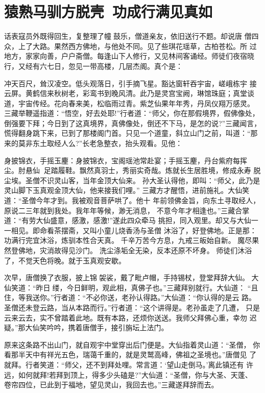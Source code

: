 \chapter{猿熟马驯方脱壳~功成行满见真如}

话表寇员外既得回生，复整理了幢鼓乐，僧道亲友，依旧送行不题。却说唐
僧四众，上了大路。果然西方佛地，与他处不同。见了些琪花瑶草，古柏苍松。所
过地方，家家向善，户户斋僧。每逢山下人修行，又见林间客诵经。师徒们夜宿晓
行，又经有六七日，忽见一带高楼，几层杰阁。真个是：

冲天百尺，耸汉凌空。低头观落日，引手摘飞星。豁达窗轩吞宇宙，嵯峨栋宇
接云屏。黄鹤信来秋树老，彩鸾书到晚风清。此乃是灵宫宝阙，琳馆珠庭；真堂谈
道，宇宙传经。花向春来美，松临雨过青。紫芝仙果年年秀，丹凤仪翔万感灵。
三藏举鞭遥指道：“悟空，好去处耶!”行者道：“师父，你在那假境界，假佛像处，
倒强要下拜；今日到了这真境界，真佛像处，倒还不下马，是怎的说?”三藏闻言，
慌得翻身跳下来，已到了那楼阁门首。只见一个道童，斜立山门之前，叫道：“那
来的莫非东土取经人么?”长老急整衣，抬头观看。见他：

身披锦衣，手摇玉麈：身披锦衣，宝阁瑶池常赴宴；手摇玉麈，丹台紫府每挥
尘。肘悬仙，足踏履鞋。飘然真羽士，秀丽实奇哉。炼就长生居胜境，修成永寿
脱尘埃。圣僧不识灵山客，当年金顶大仙来。
孙大圣认得他，即叫：“师父，此乃是灵山脚下玉真观金顶大仙，他来接我们哩。”
三藏方才醒悟，进前施礼。大仙笑道：“圣僧今年才到。我被观音菩萨哄了。他十
年前领佛金旨，向东土寻取经人，原说二三年就到我处。我年年等候，渺无消息，
不意今年才相逢也。”三藏合掌道：“有劳大仙盛意，感激，感激!”遂此四众牵马
挑担，同入观里。却又与大仙一一相见。即命看茶摆斋，又叫小童儿烧香汤与圣僧
沐浴了，好登佛地。正是那：
功满行完宜沐浴，炼驯本性合天真。
千辛万苦今方息，九戒三皈始自新。
魔尽果然登佛地，灾消故得见沙门。
洗尘涤垢全无染，反本还原不坏身。
师徒们沐浴了，不觉天色将晚。就于玉真观安歇。

次早，唐僧换了衣服，披上锦袈裟，戴了毗卢帽，手持锡杖，登堂拜辞大仙。
大仙笑道：“昨日缕，今日鲜明，观此相，真佛子也。”三藏拜别就行。大仙道：
“且住，等我送你。”行者道：“不必你送，老孙认得路。”大仙道：“你认得的是云
路。圣僧还未登云路，当从本路而行。”行者道：“这个讲得是。老孙虽走了几遭，
只是云来云去，实不曾踏着此地。既有本路，还烦你送送。我师父拜佛心重，幸勿
迟疑。”那大仙笑吟吟，携着唐僧手，接引旃坛上法门。

原来这条路不出山门，就自观宇中堂穿出后门便是。大仙指着灵山道：“圣僧，
你看那半天中有祥光五色，瑞蔼千重的，就是灵鹫高峰，佛祖之圣境也。”唐僧见
了就拜。行者笑道：“师父，还不到拜处哩。常言道：‘望山走倒马。’离此镇还有
许远，如何就拜!若拜到顶上，得多少头磕是?”大仙道：“圣僧，你与大圣、天蓬、
卷帘四位，已此到于福地，望见灵山，我回去也。”三藏遂拜辞而去。

